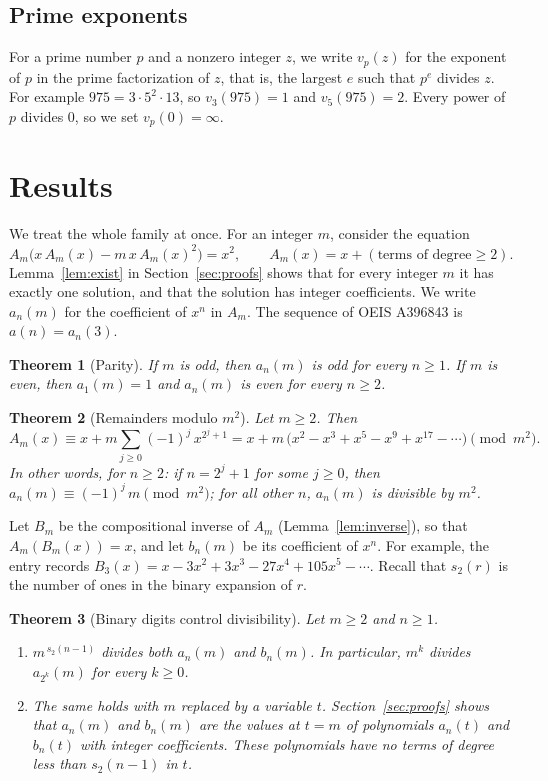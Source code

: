 \documentclass[11pt,a4paper]{article}
\newtheorem{theorem}{Theorem}[section]
\theoremstyle{definition}
\theoremstyle{remark}
\begin{document}
\subsection{Prime exponents}
For a prime number $p$ and a nonzero integer $z$, we write $v_p(z)$ for the exponent of $p$ in the prime factorization
of $z$, that is, the largest $e$ such that $p^e$ divides $z$. For example $975=3\cdot5^2\cdot13$, so $v_3(975)=1$ and
$v_5(975)=2$. Every power of $p$ divides $0$, so we set $v_p(0)=\infty$.


\section{Results}\label{sec:results}

We treat the whole family at once. For an integer $m$, consider the equation
\begin{equation}\label{eq:general}
A_m\bigl(x\,A_m(x)-m\,x\,A_m(x)^2\bigr)=x^2,\qquad A_m(x)=x+(\text{terms of degree}\ge2).
\end{equation}
Lemma~\ref{lem:exist} in Section~\ref{sec:proofs} shows that for every integer $m$ it has exactly one solution, and
that the solution has integer coefficients. We write $a_n(m)$ for the coefficient of $x^n$ in $A_m$. The sequence of
OEIS A396843 is $a(n)=a_n(3)$.

\begin{theorem}[Parity]\label{thm:parity}
If $m$ is odd, then $a_n(m)$ is odd for every $n\ge1$. If $m$ is even, then $a_1(m)=1$ and $a_n(m)$ is even for every
$n\ge2$.
\end{theorem}

\begin{theorem}[Remainders modulo $m^2$]\label{thm:modsq}
Let $m\ge2$. Then
\[
A_m(x)\equiv x+m\sum_{j\ge0}(-1)^j\,x^{2^j+1}=x+m\,\bigl(x^2-x^3+x^5-x^9+x^{17}-\cdots\bigr)\pmod{m^2}.
\]
In other words, for $n\ge2$: if $n=2^j+1$ for some $j\ge0$, then $a_n(m)\equiv(-1)^j\,m\pmod{m^2}$; for all other $n$,
$a_n(m)$ is divisible by $m^2$.
\end{theorem}

Let $B_m$ be the compositional inverse of $A_m$ (Lemma~\ref{lem:inverse}), so that $A_m(B_m(x))=x$, and let $b_n(m)$ be
its coefficient of $x^n$. For example, the entry records $B_{3}(x)=x-3x^2+3x^3-27x^4+105x^5-\cdots.$
Recall that $s_2(r)$ is the number of ones in the binary expansion of $r$.

\begin{theorem}[Binary digits control divisibility]\label{thm:binary}
Let $m\ge2$ and $n\ge1$.
\begin{enumerate}[label=(\alph*)]
\item $m^{\,s_2(n-1)}$ divides both $a_n(m)$ and $b_n(m)$. In particular, $m^k$ divides $a_{2^k}(m)$ for every $k\ge0$.
\item The same holds with $m$ replaced by a variable $t$. Section~\ref{sec:proofs} shows that $a_n(m)$ and $b_n(m)$ are
the values at $t=m$ of polynomials $a_n(t)$ and $b_n(t)$ with integer coefficients. These polynomials have no terms of
degree less than $s_2(n-1)$ in $t$.
\end{enumerate}
\end{theorem}
\end{document}
